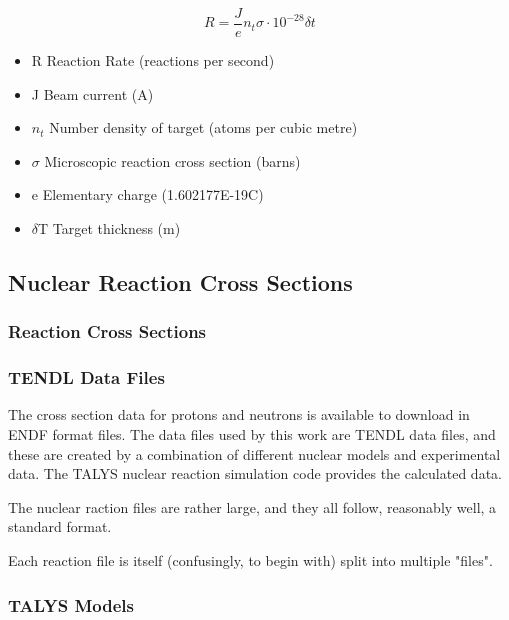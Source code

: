 \begin{equation}
R = \frac{J}{e} n_{t} \sigma \cdot 10^{-28} \delta t
\end{equation}

\begin{itemize}
\item R	Reaction Rate (reactions per second)
\item J	Beam current (A)
\item \ensuremath{n_t}	Number density of target (atoms per cubic metre)
\item \ensuremath{\sigma}	Microscopic reaction cross section (barns)
\item e	Elementary charge (1.602177E-19C)
\item \ensuremath{\delta}T	Target thickness (m)
\end{itemize}



\subsection{Nuclear Reaction Cross Sections}

\subsubsection{Reaction Cross Sections}






\subsubsection{TENDL Data Files}

The cross section data for protons and neutrons is available to download in ENDF format files.  The data files used by this work are TENDL data files, and these are created by a combination of different nuclear models and experimental data.  The TALYS nuclear reaction simulation code provides the calculated data.

The nuclear raction files are rather large, and they all follow, reasonably well, a standard format.

Each reaction file is itself (confusingly, to begin with) split into multiple "files".  




\subsubsection{TALYS Models}







